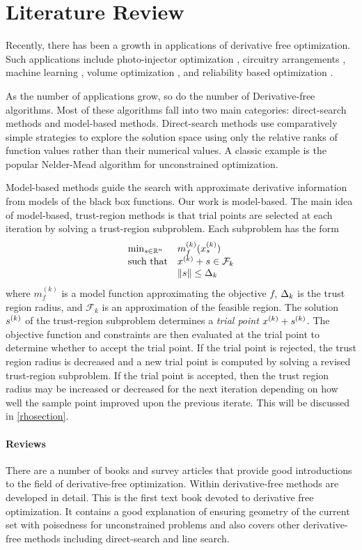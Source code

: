 \section{Literature Review}

Recently, there has been a growth in applications of derivative free optimization.
Such applications include photo-injector optimization \cite{1742-6596-874-1-012062}, 
circuitry arrangements \cite{PLOSKAS201816}, machine learning \cite{KS2018}, volume optimization \cite{Cheng2017}, 
and reliability based optimization \cite{Gao2017}.

As the number of applications grow, so do the number of Derivative-free algorithms.
Most of these algorithms fall into two main categories:  direct-search methods and model-based methods.
Direct-search methods use comparatively simple strategies to explore the solution space 
using only the relative ranks of function values rather than their numerical values.
A classic example is the popular Nelder-Mead algorithm \cite{10.1093/comjnl/7.4.308} for unconstrained optimization.

Model-based methods guide the search with approximate derivative information from models of the black box functions.
Our work is model-based.
The main idea of model-based, trust-region methods is that trial points are selected at each iteration by solving a trust-region subproblem.  
Each subproblem has the form 
\[ \begin{array}{ll} \min_{s \in \mathbb R^n} & m_f^{(k)}(x^{(k)}_s) \\ 
\textrm{such that} & x^{(k)}+s \in \mathcal{F}_k \\
& {\left\|s\right\|} \le \Delta_k
\end{array} \]
where $m_f^{(k)}$ is a model function approximating the objective $f$,   $\Delta_k$ is the trust region radius,  
and $\mathcal{F}_k$ is an approximation of the feasible region. 
The solution ${{s}^{(k)}}$ of the trust-region subproblem determines a {\em trial point} $x^{(k)} + {{s}^{(k)}}$.  
The objective function and constraints are then evaluated at the trial point to determine whether to accept the trial point.   
If the trial point is rejected, the trust region radius is decreased and a new trial point is computed by solving a revised trust-region subproblem.     
If the trial point is accepted, then the trust region radius may be increased or decreased for the next iteration 
depending on how well the sample point improved upon the previous iterate.
This will be discussed in \cref{rhosection}.

\paragraph*{Reviews}
There are a number of books and survey articles that provide good introductions to the field of derivative-free optimization.
Within \cite{introduction_book} derivative-free methods are developed in detail.
This is the first text book devoted to derivative free optimization.
It contains a good explanation of ensuring geometry of the current set with poisedness for unconstrained problems and also covers other derivative-free methods including direct-search and line search.

